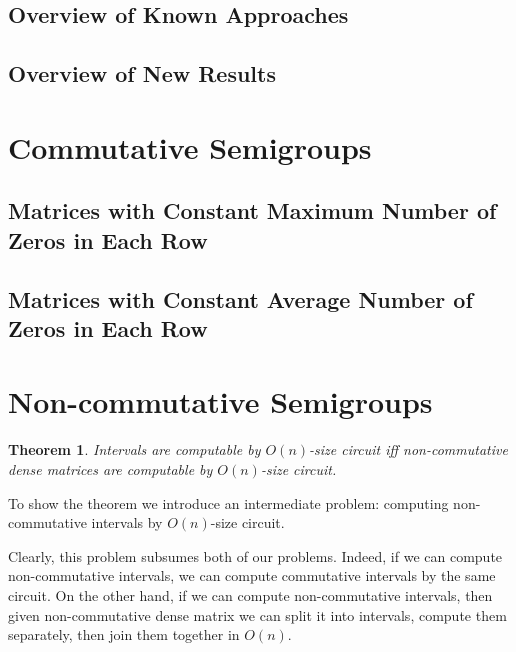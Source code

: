 \documentclass[11pt,letterpaper]{article}
\newtheorem{theorem}{Theorem}
\begin{document}



\subsection{Overview of Known Approaches}

\subsection{Overview of New Results}



\section{Commutative Semigroups}



\subsection{Matrices with Constant Maximum Number of Zeros in Each Row}

\subsection{Matrices with Constant Average Number of Zeros in Each Row}

\section{Non-commutative Semigroups}

\begin{theorem}
Intervals are computable by $O(n)$-size circuit iff non-commutative dense matrices are computable by $O(n)$-size circuit.
\end{theorem}

To show the theorem we introduce an intermediate problem: computing non-commutative intervals by $O(n)$-size circuit. 

Clearly, this problem subsumes both of our problems. Indeed, if we can compute non-commutative intervals, we can compute commutative intervals by the same circuit.
On the other hand, if we can compute non-commutative intervals, then given non-commutative dense matrix we can split it into intervals, compute them separately, then join them together in $O(n)$.
\end{document}
